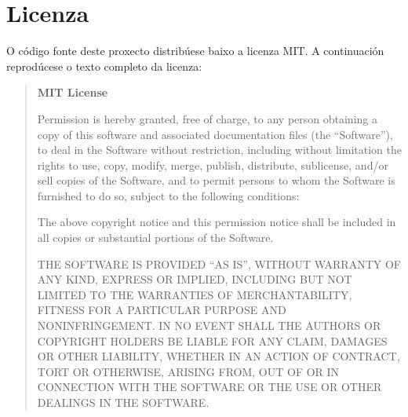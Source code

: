 \chapter{Licenza}

O código fonte deste proxecto distribúese baixo a licenza MIT\@. A continuación reprodúcese o texto completo da licenza:

\begin{quote}
\textbf{MIT License}


\medskip
Permission is hereby granted, free of charge, to any person obtaining a copy
of this software and associated documentation files (the ``Software''), to deal
in the Software without restriction, including without limitation the rights
to use, copy, modify, merge, publish, distribute, sublicense, and/or sell
copies of the Software, and to permit persons to whom the Software is
furnished to do so, subject to the following conditions:

\medskip
The above copyright notice and this permission notice shall be included in all
copies or substantial portions of the Software.

\medskip
THE SOFTWARE IS PROVIDED ``AS IS'', WITHOUT WARRANTY OF ANY KIND, EXPRESS OR
IMPLIED, INCLUDING BUT NOT LIMITED TO THE WARRANTIES OF MERCHANTABILITY,
FITNESS FOR A PARTICULAR PURPOSE AND NONINFRINGEMENT. IN NO EVENT SHALL THE
AUTHORS OR COPYRIGHT HOLDERS BE LIABLE FOR ANY CLAIM, DAMAGES OR OTHER
LIABILITY, WHETHER IN AN ACTION OF CONTRACT, TORT OR OTHERWISE, ARISING FROM,
OUT OF OR IN CONNECTION WITH THE SOFTWARE OR THE USE OR OTHER DEALINGS IN THE
SOFTWARE.
\end{quote}
